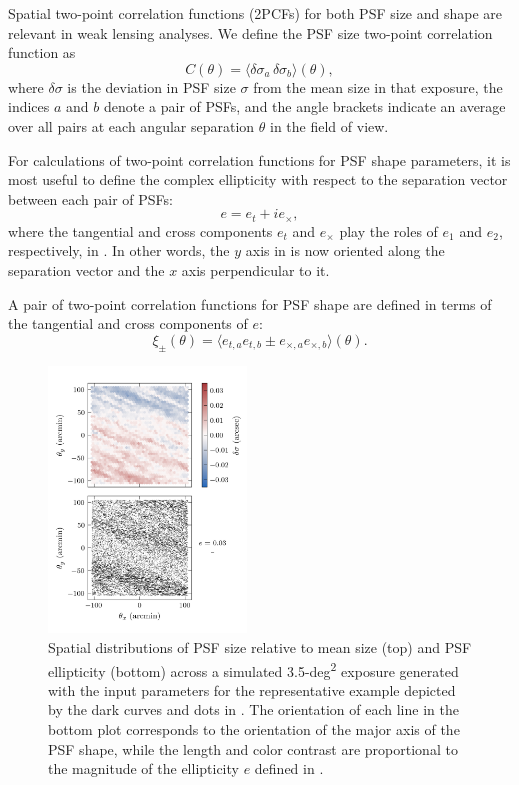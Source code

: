 \documentclass[twocolumn,twocolappendix]{openjournal}
\begin{document}
Spatial two-point correlation functions (2PCFs) for both PSF size and shape are relevant in weak lensing analyses. 
We define the PSF size two-point correlation function as 
\begin{equation}
    C(\theta) = \langle \delta\sigma_a \, \delta\sigma_b\rangle(\theta),
    \label{eqn:shape_corr}
\end{equation}
where $\delta\sigma$ is the deviation in PSF size $\sigma$ from the mean size in that exposure, the indices $a$ and $b$ denote a pair of PSFs, and the angle brackets indicate an average over all pairs at each angular separation $\theta$ in the field of view. 

For calculations of two-point correlation functions for PSF shape parameters, it is most useful to define the complex ellipticity with respect to the separation vector between each pair of PSFs:
\begin{equation}
e = e_t + i e_\times,
\label{eqn:e_deftx}
\end{equation}
where the tangential  and cross components $e_t$ and $e_\times$ play the roles of $e_1$ and $e_2$, respectively, in . 
In other words, the $y$ axis in  is now oriented along the separation vector and the $x$ axis perpendicular to it.

A pair of two-point correlation functions for PSF shape are defined in terms of the tangential and cross components of $e$: 
\begin{equation}
    \xi_\pm(\theta) = \langle e_{t,a} e_{t,b} \pm e_{\times,a} e_{\times,b} \rangle(\theta). 
\end{equation}


\begin{figure}
\includegraphics[width=0.47\textwidth]{f3_output_example.png}
    \caption{
    Spatial distributions of PSF size relative to mean size (top) and PSF ellipticity (bottom) across a simulated 3.5-\unit{deg^2} exposure generated with the \psfws input parameters for the representative example depicted by the dark curves and dots in .   
    The orientation of each line in the bottom plot corresponds to the orientation of the major axis of the PSF shape, while the length and color contrast are proportional to the magnitude of the ellipticity $e$ defined in . 
    \label{fig:output}
    }
\end{figure}
\end{document}
